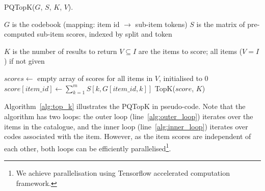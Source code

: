 \documentclass[sigconf,natbib=true, review=False]{acmart} %
\newcommand{\pageenlarge}[1]{\marginnote{#1}\enlargethispage{#1\baselineskip}}
\newcommand{\scrc}[1]{\textcolor[HTML]{000000}{#1}}
\begin{document}

   



\begin{algorithm}[tb]
\small
\caption{PQTopK($G$, $S$, $K$, $V$).}\label{alg:top_k}
\begin{algorithmic}[1]
   \Require $G$ is the codebook (mapping: item id $\rightarrow$ sub-item tokens)
   \Require $S$ is the matrix of pre-computed sub-item scores, indexed by split and token

   \Require $K$ is the number of results to return
   \Require $V \subseteq I$ are the items to score; all items ($V = I$)  if not given 
   
   \State $scores \gets$ empty array of scores for all items in $V$, initialised to 0
    \label{alg:outer_loop} 
        \State $score[item\_id] \gets \sum_{k=1}^{m} S[k,G[item\_id,k]] \label{alg:inner_loop} $ 
   \EndFor
   \State \Return TopK($score$, $K$)  
\end{algorithmic}
\end{algorithm}

Algorithm~\ref{alg:top_k} illustrates the PQTopK in pseudo-code. Note that the algorithm has two loops: the outer loop (line~\ref{alg:outer_loop}) iterates over the items in the catalogue, and the inner loop (line~\ref{alg:inner_loop}) iterates over codes associated with the item. However, as the item scores are independent of each other, both loops can be efficiently parallelised\footnote{\scrc{We achieve parallelisation using Tensorflow accelerated computation framework.}}. 
\end{document}

